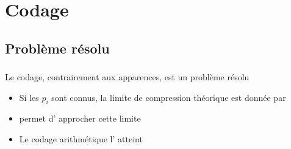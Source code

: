 \documentclass{beamer}
\newcommand{\relief}[1]{{\color{structureTextColor} #1}}
\theoremstyle{theoreme}
\begin{document}
\section{Codage}
\subsection{Problème résolu}

\begin{frame}
  \frametitle{\secname{}}
  \framesubtitle{\subsecname{}}
  Le codage, contrairement aux apparences, est un problème \relief{résolu}
  \begin{itemize}
    \item\pause Si les $p_i$ sont connus, la limite de compression théorique est donnée par 
    \item\pause {} permet d'\relief{approcher} cette limite
    \item\pause Le codage arithmétique l'\relief{atteint}
  \end{itemize}
\end{frame}
\end{document}
